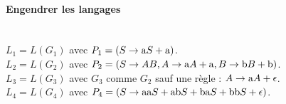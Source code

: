 \documentclass[a4paper]{article}
\newcommand{\ct}{\textnormal}
\begin{document}
\paragraph{Engendrer les langages}~\\
$L_1=L(G_1)$ avec $P_1 = (S\rightarrow\ct{a}S+\ct{a})$.\\
$L_2=L(G_2)$ avec $P_2 = (S\rightarrow AB, A\rightarrow\ct{a}A+\ct{a}, B\rightarrow\ct{b}B+\ct{b})$.\\
$L_3=L(G_3)$ avec $G_3$ comme $G_2$ sauf une règle : $A\rightarrow\ct{a}A+\epsilon$.\\
$L_4=L(G_4)$ avec $P_4 = (S\rightarrow\ct{aa}S+\ct{ab}S+\ct{ba}S+\ct{bb}S+\epsilon)$.\\
~~~~
~~~~
~~~~
\end{document}
